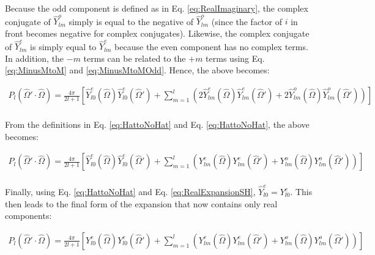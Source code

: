\documentclass[10pt]{article}
\begin{document}
\begin{flushleft}
Because the odd component is defined as in Eq. \eqref{eq:RealImaginary}, the complex conjugate of \(\hat{Y}_{lm}^o\) simply is equal to the negative of \(\hat{Y}_{lm}^o\) (since the factor of \(i\) in front becomes negative for complex conjugates). Likewise, the complex conjugate of \(\hat{Y}_{lm}^e\) is simply equal to \(\hat{Y}_{lm}^e\) because the even component has no complex terms. In addition, the \(-m\) terms can be related to the \(+m\) terms using Eq. \eqref{eq:MinusMtoM} and \eqref{eq:MinusMtoMOdd}. Hence, the above becomes:

\begin{equation}
\begin{aligned}
\label{eq:FullExpansion3}
P_l(\hat{\Omega}'\cdot\hat{\Omega})=\frac{4\pi}{2l+1}\left\lbrack \hat{Y}_{l0}^e(\hat{\Omega})\hat{Y}_{l0}^e(\hat{\Omega}')+\sum_{m=1}^{l}\left(2\hat{Y}_{lm}^e(\hat{\Omega})\hat{Y}_{lm}^{e}(\hat{\Omega}')+2\hat{Y}_{lm}^o(\hat{\Omega})\hat{Y}_{lm}^{o}(\hat{\Omega}')\right)\right\rbrack\\
\end{aligned}
\end{equation}

From the definitions in Eq. \eqref{eq:HattoNoHat} and Eq. \eqref{eq:HattoNoHat}, the above becomes:

\begin{equation}
\begin{aligned}
\label{eq:FullExpansion4}
P_l(\hat{\Omega}'\cdot\hat{\Omega})=\frac{4\pi}{2l+1}\left\lbrack \hat{Y}_{l0}^e(\hat{\Omega})\hat{Y}_{l0}^e(\hat{\Omega}')+\sum_{m=1}^{l}\left(Y_{lm}^e(\hat{\Omega})Y_{lm}^{e}(\hat{\Omega}')+Y_{lm}^o(\hat{\Omega})Y_{lm}^{o}(\hat{\Omega}')\right)\right\rbrack\\
\end{aligned}
\end{equation}

Finally, using Eq. \eqref{eq:HattoNoHat} and Eq. \eqref{eq:RealExpansionSH}, \(\hat{Y}_{l0}^e=Y_{l0}^e\). This then leads to the final form of the expansion that now contains only real components:

\begin{equation}
\begin{aligned}
\label{eq:FullExpansion5}
P_l(\hat{\Omega}'\cdot\hat{\Omega})=\frac{4\pi}{2l+1}\left\lbrack Y_{l0}^e(\hat{\Omega})Y_{l0}^e(\hat{\Omega}')+\sum_{m=1}^{l}\left(Y_{lm}^e(\hat{\Omega})Y_{lm}^{e}(\hat{\Omega}')+Y_{lm}^o(\hat{\Omega})Y_{lm}^{o}(\hat{\Omega}')\right)\right\rbrack\\
\end{aligned}
\end{equation}






\end{flushleft}
\end{document}
